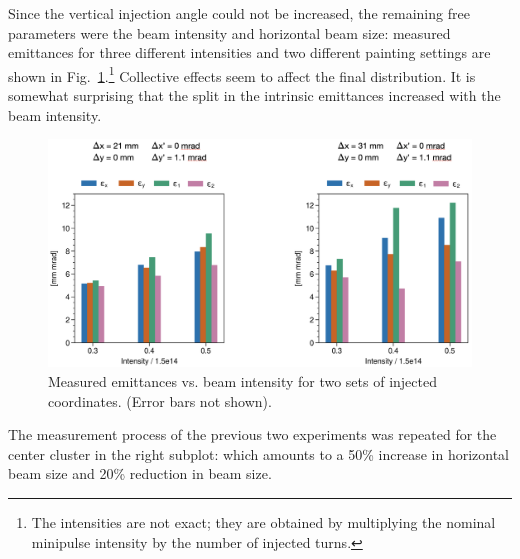Since the vertical injection angle could not be increased, the remaining free parameters were the beam intensity and horizontal beam size: measured emittances for three different intensities and two different painting settings are shown in Fig.~\ref{fig:exp3_search}.\footnote{The intensities are not exact; they are obtained by multiplying the nominal minipulse intensity by the number of injected turns.} Collective effects seem to affect the final distribution. It is somewhat surprising that the split in the intrinsic emittances increased with the beam intensity. 
%
\begin{figure}[!p]
    \centering
    \vspace*{1.0cm}
    \includegraphics[width=\textwidth]{Images/chapter5/exp3/search.png}
    \caption{Measured emittances vs. beam intensity for two sets of injected coordinates. (Error bars not shown).}
    \label{fig:exp3_search}
    \vspace*{1.0cm}
\end{figure}
%
The measurement process of the previous two experiments was repeated for the center cluster in the right subplot: which amounts to a 50\% increase in horizontal beam size and 20\% reduction in beam size. 

